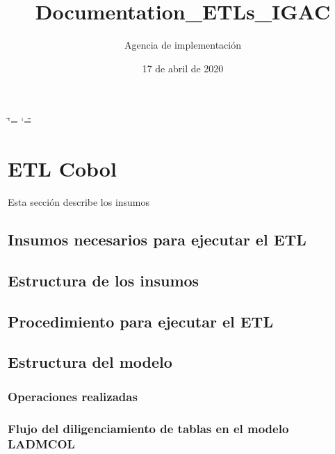\documentclass[letterpaper,10pt,spanish]{sphinxmanual}
\title{Documentation\_ETLs\_IGAC}
\date{17 de abril de 2020}
\author{Agencia de implementación}
\begin{document}
\ifdefined\shorthandoff
  \ifnum\catcode`\=\string=\active\shorthandoff{=}\fi
  \ifnum\catcode`\"=\active{}\fi
\fi

\pagestyle{empty}
\sphinxmaketitle
\pagestyle{plain}
\sphinxtableofcontents
\pagestyle{normal}
\label{\detokenize{index::doc}}



\chapter{ETL Cobol}
\label{\detokenize{ETL Cobol:etl-cobol}}\label{\detokenize{ETL Cobol::doc}}
Esta sección describe los insumos


\section{Insumos necesarios para ejecutar el ETL}
\label{\detokenize{ETL_Cobol/supplies:insumos-necesarios-para-ejecutar-el-etl}}\label{\detokenize{ETL_Cobol/supplies::doc}}

\section{Estructura de los insumos}
\label{\detokenize{ETL_Cobol/Structure:estructura-de-los-insumos}}\label{\detokenize{ETL_Cobol/Structure::doc}}

\section{Procedimiento para ejecutar el ETL}
\label{\detokenize{ETL_Cobol/Process:procedimiento-para-ejecutar-el-etl}}\label{\detokenize{ETL_Cobol/Process::doc}}

\section{Estructura del modelo}
\label{\detokenize{ETL_Cobol/Model:estructura-del-modelo}}\label{\detokenize{ETL_Cobol/Model::doc}}

\subsection{Operaciones realizadas}
\label{\detokenize{ETL_Cobol/Model:operaciones-realizadas}}

\subsection{Flujo del diligenciamiento de tablas en el modelo LADM\sphinxhyphen{}COL}
\label{\detokenize{ETL_Cobol/Model:flujo-del-diligenciamiento-de-tablas-en-el-modelo-ladm-col}}
\end{document}
